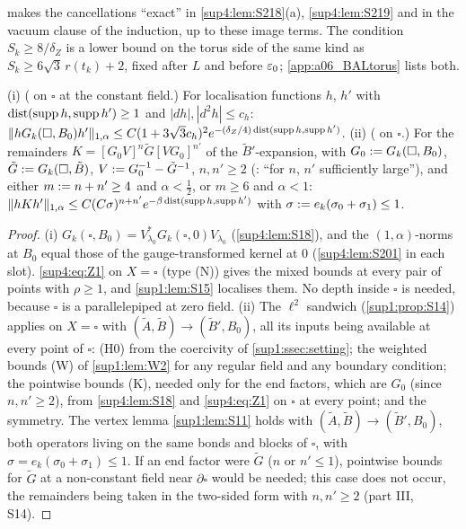  makes the cancellations ``exact'' in \cref{sup4:lem:S218}(a), \cref{sup4:lem:S219} and in the vacuum clause of the induction, up to these image terms. The condition $S_k\ge8/\delta_Z$ is a lower bound on the torus side of the same kind as $S_k\ge6\sqrt3\,r(t_k)+2$, fixed after $L$ and before $\varepsilon_0$; \cref{app:a06_BALtorus} lists both.

\begin{lemma}\label{sup4:lem:F3}
\textup{(i)} (\cite[(3.1)]{Ba3} on $\square$ at the constant field.) For localisation functions $h$, $h'$ with $\operatorname{dist}(\operatorname{supp} h,\operatorname{supp} h')\ge1$ and $|dh|,|d^2h|\le c_h$: $\lVert hG_k(\square,B_0)h'\rVert_{1,\alpha}\le C(1+3\sqrt3c_h)^2e^{-(\delta_Z/4)\operatorname{dist}(\operatorname{supp} h,\operatorname{supp} h')}$. \textup{(ii)} (\cite[(1.16)]{Ba3} on $\square$.) For the remainders $K=[G_0V]^n\tilde G[VG_0]^{n'}$ of the $\tilde B'$-expansion, with $G_0:= G_k(\square,B_0)$, $\tilde G:= G_k(\square,\tilde B)$, $V:= G_0^{-1}-\tilde G^{-1}$, $n,n'\ge2$ (\cite[p.~414]{Ba3}: ``for $n$, $n'$ sufficiently large''), and either $m:= n+n'\ge4$ and $\alpha<\frac12$, or $m\ge6$ and $\alpha<1$: $\lVert hKh'\rVert_{1,\alpha}\le C(C\sigma)^{n+n'}e^{-\beta\operatorname{dist}(\operatorname{supp} h,\operatorname{supp} h')}$ with $\sigma:= e_k(\sigma_0+\sigma_1)\le1$.
\end{lemma}

\begin{proof}
(i) $G_k(\square,B_0)=V_{\lambda_0}^*G_k(\square,0)V_{\lambda_0}$ (\cref{sup4:lem:S18}), and the $(1,\alpha)$-norms at $B_0$ equal those of the gauge-transformed kernel at $0$ (\cref{sup4:lem:S201} in each slot). \eqref{sup4:eq:Z1} on $X=\square$ (type (N)) gives the mixed bounds at every pair of points with $\rho\ge1$, and \cref{sup1:lem:S15} localises them. No depth inside $\square$ is needed, because $\square$ is a parallelepiped at zero field. (ii) The $\ell^2$ sandwich (\cref{sup1:prop:S14}) applies on $X=\square$ with $(\tilde A,\tilde B)\to(\tilde B',B_0)$, all its inputs being available at every point of $\square$: (H0) from the coercivity of \cref{sup1:ssec:setting}; the weighted bounds (W) of \cref{sup1:lem:W2} for any regular field and any boundary condition; the pointwise bounds (K), needed only for the end factors, which are $G_0$ (since $n,n'\ge2$), from \cref{sup4:lem:S18} and \eqref{sup4:eq:Z1} on $\square$ at every point; and the symmetry. The vertex lemma \cref{sup1:lem:S11} holds with $(\tilde A,\tilde B)\to(\tilde B',B_0)$, both operators living on the same bonds and blocks of $\square$, with $\sigma=e_k(\sigma_0+\sigma_1)\le1$. If an end factor were $\tilde G$ ($n$ or $n'\le1$), pointwise bounds for $\tilde G$ at a non-constant field near $\partial\square$ would be needed; this case does not occur, the remainders being taken in the two-sided form with $n,n'\ge2$ (part III, S14).
\end{proof}


